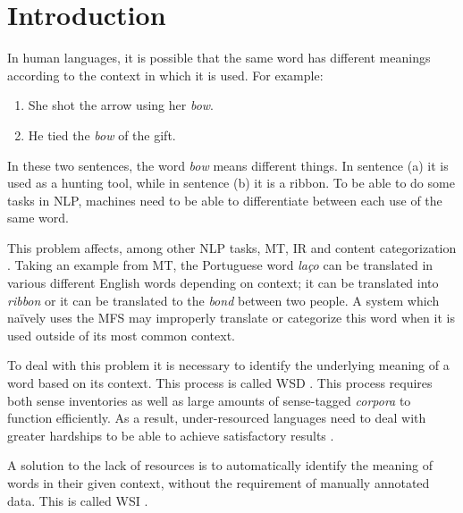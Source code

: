 \chapter{Introduction}


In human languages, it is possible that the same word has different meanings
according to the context in which it is used. For example:

\begin{enumerate}[label=(\alph*)]
 \item She shot the arrow using her \textit{bow}.
 \item He tied the \textit{bow} of the gift.
\end{enumerate}

In these two sentences, the word \textit{bow} means different things. In
sentence (a) it is used as a hunting tool, while in sentence (b) it is a ribbon.
To be able to do some tasks in \ac{NLP}, machines need to be able to
differentiate between each use of the same word.


This problem affects, among other \ac{NLP} tasks, \ac{MT}, \ac{IR} and content
categorization \citep{navigli2009word}. Taking an example from \ac{MT}, the
Portuguese word \textit{laço} can be translated in various different English
words depending on context; it can be translated into \textit{ribbon} or it can
be translated to the \textit{bond} between two people. A system which naïvely
uses the \ac{MFS} may improperly translate or categorize this word when it is
used outside of its most common context.


To deal with this problem it is necessary to identify the underlying meaning of
a word based on its context. This process is called \ac{WSD}
\citep{navigli2009word}. This process requires both sense inventories as well as
large amounts of sense-tagged \emph{corpora} to function efficiently. As a
result, under-resourced languages need to deal with greater hardships to be
able to achieve satisfactory results \citep{ng1997getting}.

A solution to the lack of resources is to automatically identify the meaning of
words in their given context, without the requirement of manually annotated
data. This is called \ac{WSI} \citep{agirre2007semeval}.


